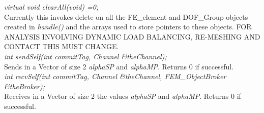 {\em virtual void clearAll(void) =0;} \\
Currently this invokes delete on all the FE\_element and DOF\_Group
objects created in {\em handle()} and the arrays used to store
pointers to these objects. FOR ANALYSIS INVOLVING DYNAMIC LOAD
BALANCING, RE-MESHING AND CONTACT THIS MUST CHANGE. \\

{\em int sendSelf(int commitTag, Channel \&theChannel); } \\
Sends in a Vector of size 2 {\em alphaSP} and {\em alphaMP}. Returns
$0$ if successful. \\

{\em int recvSelf(int commitTag, Channel \&theChannel, FEM\_ObjectBroker
\&theBroker); } \\
Receives in a Vector of size 2 the values {\em alphaSP} and {\em
alphaMP}. Returns $0$ if successful. 